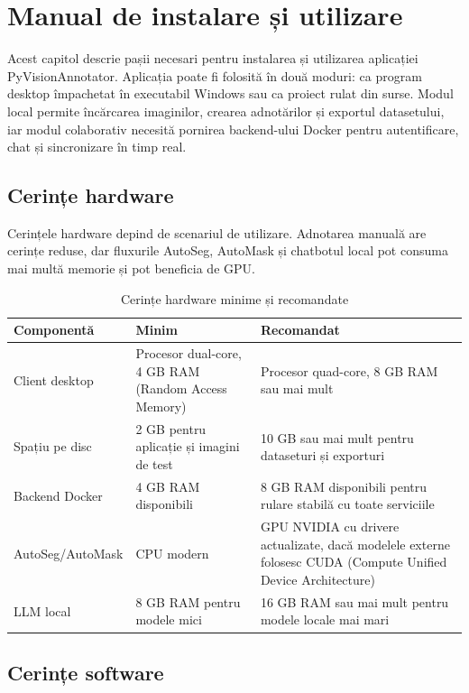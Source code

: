 \chapter{Manual de instalare și utilizare}
\pagestyle{fancy}

Acest capitol descrie pașii necesari pentru instalarea și utilizarea aplicației PyVisionAnnotator. Aplicația poate fi folosită în două moduri: ca program desktop împachetat în executabil Windows sau ca proiect rulat din surse. Modul local permite încărcarea imaginilor, crearea adnotărilor și exportul datasetului, iar modul colaborativ necesită pornirea backend-ului Docker pentru autentificare, chat și sincronizare în timp real.

\section{Cerințe hardware}

Cerințele hardware depind de scenariul de utilizare. Adnotarea manuală are cerințe reduse, dar fluxurile AutoSeg, AutoMask și chatbotul local pot consuma mai multă memorie și pot beneficia de GPU.

\begin{table}[!htbp]
    \centering
    \small
    \begin{tabular}{p{} p{} p{}}
        \hline
        Componentă & Minim & Recomandat \\
        \hline
        Client desktop & Procesor dual-core, 4 GB RAM (Random Access Memory) & Procesor quad-core, 8 GB RAM sau mai mult \\
        Spațiu pe disc & 2 GB pentru aplicație și imagini de test & 10 GB sau mai mult pentru dataseturi și exporturi \\
        Backend Docker & 4 GB RAM disponibili & 8 GB RAM disponibili pentru rulare stabilă cu toate serviciile \\
        AutoSeg/AutoMask & CPU modern & GPU NVIDIA cu drivere actualizate, dacă modelele externe folosesc CUDA (Compute Unified Device Architecture) \\
        LLM local & 8 GB RAM pentru modele mici & 16 GB RAM sau mai mult pentru modele locale mai mari \\
        \hline
    \end{tabular}
    \caption{Cerințe hardware minime și recomandate}
    \label{tab:cerinte-hardware}
\end{table}

\section{Cerințe software}

